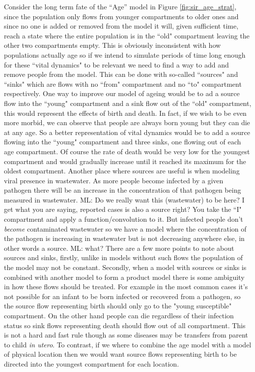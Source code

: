 \documentclass[referee,sn-basic]{sn-jnl}%
\theoremstyle{definition}
\newcommand{\mli}[1]{{\color{purple} ML: #1}}
\begin{document}
Consider the long term fate of the ``Age'' model in Figure \ref{fig:sir_age_strat}, since the population only flows from younger compartments to older ones and since no one is added or removed from the model it will, given sufficient time, reach a state where the entire population is in the ``old" compartment leaving the other two compartments empty. This is obviously inconsistent with how populations actually age so if we intend to simulate periods of time long enough for these ``vital dynamics" to be relevant we need to find a way to add and remove people from the model. This can be done with so-called ``sources" and ``sinks" which are flows with no ``from" compartment and no ``to" compartment respectively. One way to improve our model of ageing would be to ad a source flow into the ``young" compartment and a sink flow out of the ``old" compartment, this would represent the effects of birth and death. In fact, if we wish to be even more morbid, we can observe that people are always born young but they can die at any age. So a better representation of vital dynamics would be to add a source flowing into the ``young" compartment and three sinks, one flowing out of each age compartment. Of course the rate of death would be very low for the youngest compartment and would gradually increase until it reached its maximum for the oldest compartment. Another place where sources are useful is when modeling viral presence in wastewater. As more people become infected by a given pathogen there will be an increase in the concentration of that pathogen being measured in wastewater. \mli{Do we really want this (wastewater) to be here? I get what you are saying, reported cases is also a source right? You take the ``I" compartment and apply a function/convolution to it.} But infected people don't \emph{become} contaminated wastewater so we have a model where the concentration of the pathogen is increasing in wastewater but is not decreasing anywhere else, in other words a source. \mli{what?} There are a few more points to note about sources and sinks, firstly, unlike in models without such flows the population of the model may not be constant. Secondly, when a model with sources or sinks is combined with another model to form a product model there is some ambiguity in how these flows should be treated. For example in the most common cases it's not possible for an infant to be born infected or recovered from a pathogen, so the source flow representing birth should only go to the "young susceptible" compartment. On the other hand people can die regardless of their infection status so sink flows representing death should flow out of all compartment. This is not a hard and fast rule though as some diseases may be transfers from parent to child \emph{in utero}. To contrast, if we where to combine the age model with a model of physical location then we would want source flows representing birth to be directed into the youngest compartment for each location.
\end{document}
